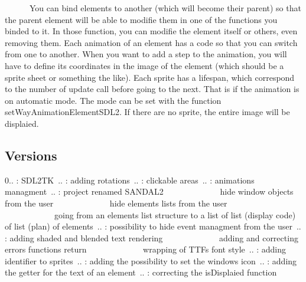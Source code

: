\begin{DoxyItemize}
 ~~~~~~You can bind elements to another (which will become their parent) so that the parent element will be able to modifie them in one of the functions you binded to it. In those function, you can modifie the element itself or others, even removing them. Each animation of an element has a code so that you can switch from one to another. When you want to add a step to the animation, you will have to define its coordinates in the image of the element (which should be a sprite sheet or something the like). Each sprite has a lifespan, which correspond to the number of update call before going to the next. That is if the animation is on \textquotesingle{}automatic\textquotesingle{} mode. The mode can be set with the function set\+Way\+Animation\+Element\+S\+D\+L2. If there are no sprite, the entire image will be displaied.~\newline

\end{DoxyItemize}

\subsection*{Versions}

0.. \+: S\+D\+L2\+TK~.. \+: adding rotations~.. \+: clickable areas~.. \+: animation\textquotesingle{}s managment~.. \+: project renamed S\+A\+N\+D\+A\+L2~\newline
 ~~~~~~~~~~~~hide window objects from the user~\newline
 ~~~~~~~~~~~~hide element\textquotesingle{}s lists from the user~\newline
 ~~~~~~~~~~~~going from an element\textquotesingle{}s list structure to a list of list (display code) of list (plan) of elements~.. \+: possibility to hide event managment from the user~.. \+: adding shaded and blended text rendering~\newline
 ~~~~~~~~~~~~adding and correcting error\textquotesingle{}s functions return~\newline
 ~~~~~~~~~~~~wrapping of T\+TF\textquotesingle{}s font style~.. \+: adding identifier to sprites~.. \+: adding the possibility to set the window\textquotesingle{}s icon~.. \+: adding the getter for the text of an element~.. \+: correcting the is\+Displaied function~\newline


